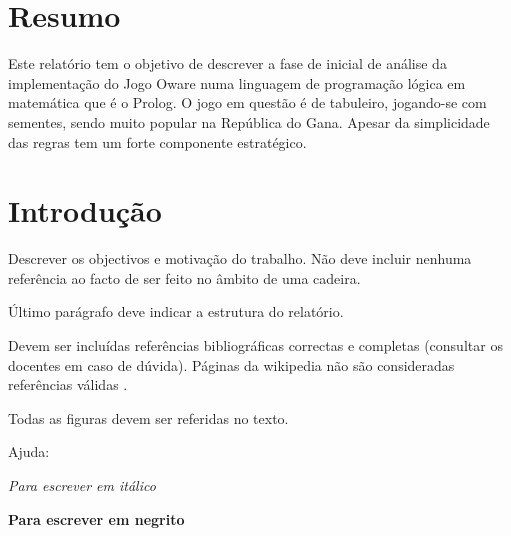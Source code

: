 \documentclass[15pt,a4paper]{article}
\begin{document}
\newpage

\section*{Resumo}
Este relatório tem o objetivo de descrever a fase de inicial de análise da implementação do Jogo Oware numa linguagem de programação lógica em matemática que é o Prolog. O jogo em questão é de tabuleiro, jogando-se com sementes, sendo muito popular na República do Gana. Apesar da simplicidade das regras tem um forte componente estratégico.



\section{Introdução}
Descrever os objectivos e motivação do trabalho. Não deve incluir nenhuma referência ao facto de ser feito no âmbito de uma cadeira.

Último parágrafo deve indicar a estrutura do relatório.

Devem ser incluídas referências bibliográficas correctas e completas (consultar os docentes em caso de dúvida). Páginas da wikipedia não são consideradas referências válidas \cite{CodigoSite, CodigoLivro}.

Todas as figuras devem ser referidas no texto. %



Ajuda:

\textit{Para escrever em itálico}

\textbf{Para escrever em negrito}
\end{document}
